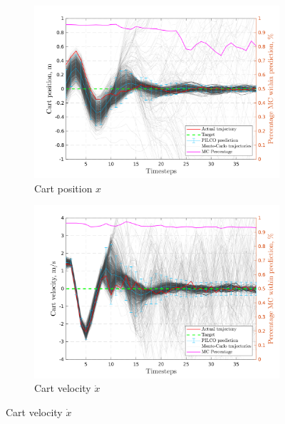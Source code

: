 \begin{figure}[htp!]    
  \begin{subfigure}[b]{0.48\linewidth}
    \centering
    \includegraphics[height=0.22\textheight,width=1\textwidth]{Chapter3/Figures/cp_MC_rollout_Ep_15_Dim_1.png} 
    \caption{Cart position $x$} 
    \label{Fig:Re-cp-cart-position} 
  \end{subfigure} 
  \hspace{\fill}  %
  \begin{subfigure}[b]{0.48\linewidth}
    \centering
    \includegraphics[height=0.22\textheight,width=1\textwidth]{Chapter3/Figures/cp_MC_rollout_Ep_15_Dim_2.png} 
    \caption{Cart velocity $\dot x$} 
    \label{Fig:Re-cp-cart-velocity} 
  \end{subfigure} 


\end{figure}
